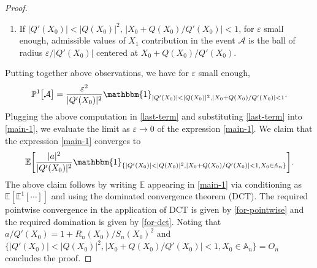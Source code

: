 \documentclass[10pt,a4paper]{amsart}
\newcommand{\mb}{\mathbb}
\renewcommand\epsilon{\varepsilon}
\begin{document}
\begin{proof}
\begin{enumerate}
\item If $|Q'(X_0)| < |Q(X_0)|^2$, \hspace{1mm} $|X_0 + Q(X_0)/Q'(X_0)| < 1$, for $\epsilon$ small enough, admissible values of $X_1$ contribution in the event $\mathcal{A}$ is the ball of radius $\epsilon/|Q'(X_0)|$ centered at $X_0 + Q(X_0)/Q'(X_0)$. 

\end{enumerate}

Putting together above observations, we have for $\epsilon$ small enough, 
\begin{equation}\label{for-pointwise}
\mb{P}^1\bigl[\mathcal{A}\bigr] = \frac{\epsilon^2}{|Q'(X_0)|^2} \mathbbm{1}_{|Q'(X_0)| < |Q(X_0)|^2, |X_0 + Q(X_0)/Q'(X_0)| < 1}.
\end{equation} 
Plugging the above computation in \eqref{last-term} and substituting \eqref{last-term} into \eqref{main-1}, we evaluate the limit as $\epsilon \to 0$ of the expression \eqref{main-1}. We claim that the expression \eqref{main-1} converges to 
\[ \mb{E}\biggl[ \frac{|a|^2}{|Q'(X_0)|^2} \mathbbm{1}_{\{|Q'(X_0)| < |Q(X_0)|^2, |X_0 + Q(X_0)/Q'(X_0)| < 1, X_0 \in \mb{A}_n\}}\biggr].\]
The above claim follows by writing $\mb{E}$ appearing in \eqref{main-1} via conditioning as $\mb{E}[\mb{E}^1[\cdots]]$ and using the dominated convergence theorem (DCT). The required pointwise convergence in the application of DCT is given by \eqref{for-pointwise} and the required domination is given by \eqref{for-dct}. Noting that $a/Q'(X_0) = 1 + R_n(X_0)/S_n(X_0)^2$ and $\{|Q'(X_0)| < |Q(X_0)|^2, |X_0 + Q(X_0)/Q'(X_0)| < 1, X_0 \in \mb{A}_n\} = O_n$ concludes the proof. 
\end{proof}
\end{document}
